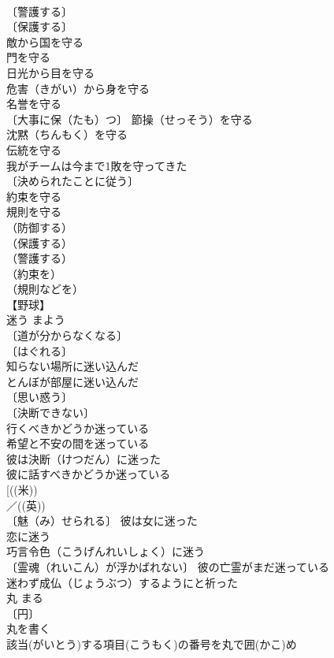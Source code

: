 \documentclass[8pt]{extreport}
\begin{document}
\begin{CJK}{UTF8}{min}
\\	〔警護する〕
\\	〔保護する〕
\\	敵から国を守る 
\\	門を守る 
\\	日光から目を守る 
\\	危害（きがい）から身を守る 
\\	名誉を守る 
\\	〔大事に保（たも）つ〕 節操（せっそう）を守る 
\\	沈黙（ちんもく）を守る 
\\	伝統を守る 
\\	我がチームは今まで1敗を守ってきた 
\\	〔決められたことに従う〕
\\	約束を守る 
\\	規則を守る 
\\	（防御する）
\\	（保護する）
\\	（警護する）
\\	（約束を）
\\	（規則などを）
\\	【野球】
\\	迷う	まよう	
\\	〔道が分からなくなる〕
\\	〔はぐれる〕
\\	知らない場所に迷い込んだ 
\\	とんぼが部屋に迷い込んだ 
\\	〔思い惑う〕
\\	〔決断できない〕
\\	行くべきかどうか迷っている 
\\	希望と不安の間を迷っている 
\\	彼は決断（けつだん）に迷った 
\\	彼に話すべきかどうか迷っている 
\\	[((米))
\\	／((英))
\\	〔魅（み）せられる〕 彼は女に迷った 
\\	恋に迷う 
\\	巧言令色（こうげんれいしょく）に迷う 
\\	〔霊魂（れいこん）が浮かばれない〕 彼の亡霊がまだ迷っている 
\\	迷わず成仏（じょうぶつ）するようにと祈った 
\\	丸	まる	
\\	〔円〕
\\	丸を書く 
\\	該当(がいとう)する項目(こうもく)の番号を丸で囲(かこ)め 

\end{CJK}
\end{document}
